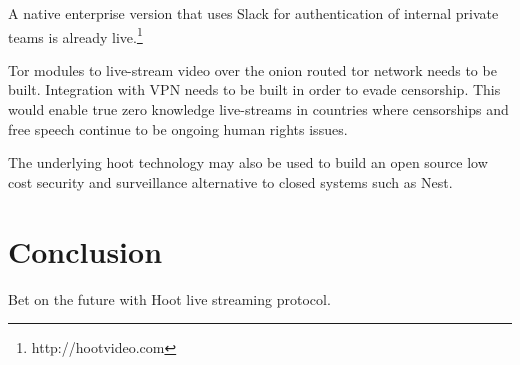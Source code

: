 \documentclass{article}
\begin{document}
A native enterprise version that uses Slack for authentication of
internal private teams is already live.\footnote{http://hootvideo.com}

Tor modules to live-stream video over the onion routed tor network needs
to be built. Integration with VPN needs to be built in order to evade censorship. This would enable true zero knowledge live-streams in
countries where censorships and free speech continue to be ongoing
human rights issues.

The underlying hoot technology may also be used to build an open
source low cost security and surveillance alternative to closed systems
such as Nest.

\section{Conclusion}
Bet on the future with Hoot live streaming protocol.

\newpage





\end{document}
